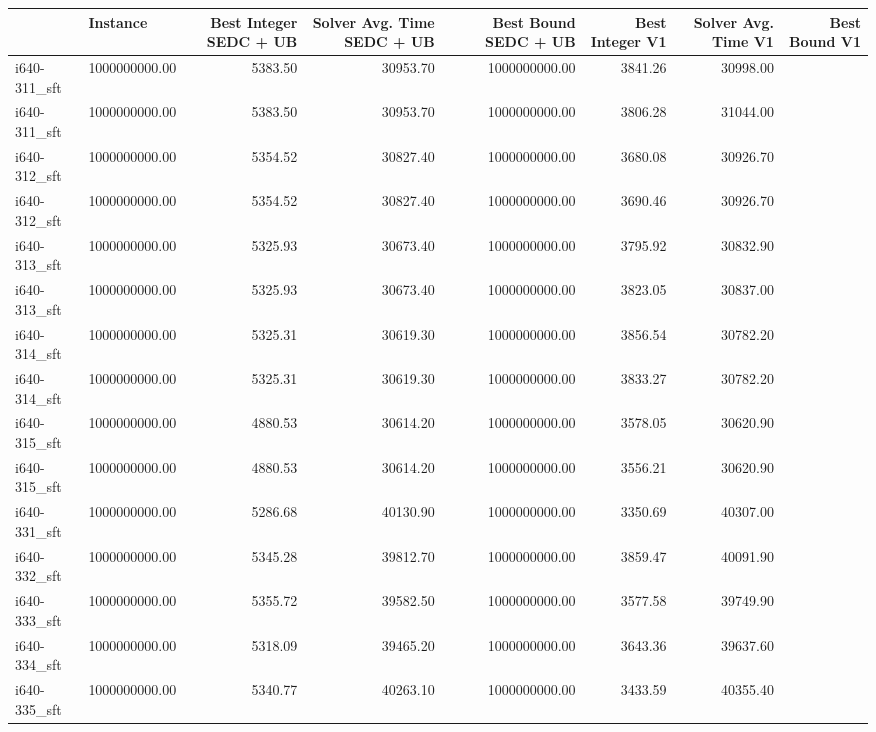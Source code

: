 \begin{tabular}{llrrrrrr}
\toprule
{} &      Instance &  Best Integer SEDC + UB &  Solver Avg. Time SEDC + UB &  Best Bound SEDC + UB &  Best Integer V1 &  Solver Avg. Time V1 &  Best Bound V1 \\
\midrule
i640-311\_sft &           1000000000.00 &                     5383.50 &              30953.70 &    1000000000.00 &              3841.26 &       30998.00 \\
i640-311\_sft &           1000000000.00 &                     5383.50 &              30953.70 &    1000000000.00 &              3806.28 &       31044.00 \\
i640-312\_sft &           1000000000.00 &                     5354.52 &              30827.40 &    1000000000.00 &              3680.08 &       30926.70 \\
i640-312\_sft &           1000000000.00 &                     5354.52 &              30827.40 &    1000000000.00 &              3690.46 &       30926.70 \\
i640-313\_sft &           1000000000.00 &                     5325.93 &              30673.40 &    1000000000.00 &              3795.92 &       30832.90 \\
i640-313\_sft &           1000000000.00 &                     5325.93 &              30673.40 &    1000000000.00 &              3823.05 &       30837.00 \\
i640-314\_sft &           1000000000.00 &                     5325.31 &              30619.30 &    1000000000.00 &              3856.54 &       30782.20 \\
i640-314\_sft &           1000000000.00 &                     5325.31 &              30619.30 &    1000000000.00 &              3833.27 &       30782.20 \\
i640-315\_sft &           1000000000.00 &                     4880.53 &              30614.20 &    1000000000.00 &              3578.05 &       30620.90 \\
i640-315\_sft &           1000000000.00 &                     4880.53 &              30614.20 &    1000000000.00 &              3556.21 &       30620.90 \\
i640-331\_sft &           1000000000.00 &                     5286.68 &              40130.90 &    1000000000.00 &              3350.69 &       40307.00 \\
i640-332\_sft &           1000000000.00 &                     5345.28 &              39812.70 &    1000000000.00 &              3859.47 &       40091.90 \\
i640-333\_sft &           1000000000.00 &                     5355.72 &              39582.50 &    1000000000.00 &              3577.58 &       39749.90 \\
i640-334\_sft &           1000000000.00 &                     5318.09 &              39465.20 &    1000000000.00 &              3643.36 &       39637.60 \\
i640-335\_sft &           1000000000.00 &                     5340.77 &              40263.10 &    1000000000.00 &              3433.59 &       40355.40 \\
\bottomrule
\end{tabular}
